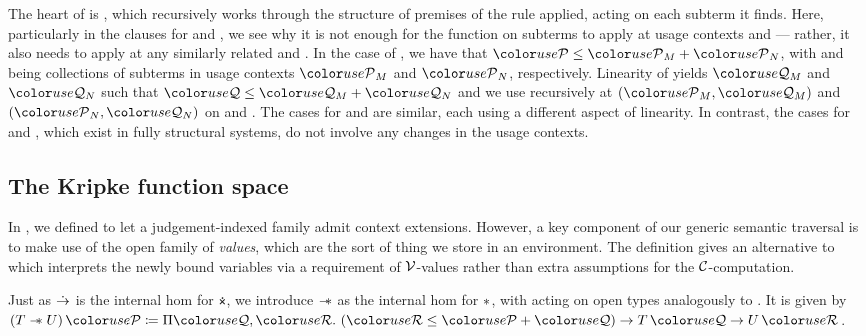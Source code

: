 The heart of  is , which recursively
works through the structure  of premises of the rule applied,
acting on each subterm it finds.
Here, particularly in the clauses for  and
, we see why it is not enough for the
function on subterms to apply at usage contexts  and 
--- rather, it also needs to apply at any similarly related 
and .
In the case of , we have that
$\grP \leq \grP_M + \grP_N$, with  and  being
collections of subterms in usage contexts $\grP_M$ and $\grP_N$, respectively.
Linearity of  yields $\grQ_M$ and $\grQ_N$ such that
$\grQ \leq \grQ_M + \grQ_N$ and we use  recursively at
$(\grP_M, \grQ_M)$ and $(\grP_N, \grQ_N)$ on  and .
The cases for  and
 are similar, each using a different aspect
of linearity.
In contrast, the cases for  and
, which exist in fully structural
systems, do not involve any changes in the usage contexts.


\subsection{The Kripke function space}\label{sec:kripke}

In , we defined  to let a
judgement-indexed family admit context extensions. However, a key
component of our generic semantic traversal is to make use of the open
family \AgdaBound{$\V$} of \emph{values}, which are the sort of thing
we store in an environment.  The definition 
gives an alternative to  which interprets the
newly bound variables via a requirement of $\V$-values rather than
extra assumptions for the $\mathcal C$-computation.


Just as $\mathrel{\dot\to}$ is the internal hom for $\dottimes$, we introduce $\mathrel{\mathord{-}\hspace{-0.75ex}*}$ as
the internal hom for $\mathbin{*}$, with  acting on open types
analogously to .
It is given by $\plr{T \wand U}\,\grP \coloneqq
\Pi\grQ,\grR.~\plr{\grR \leq \grP + \grQ} \to T\,\grQ \to U\,\grR$.

